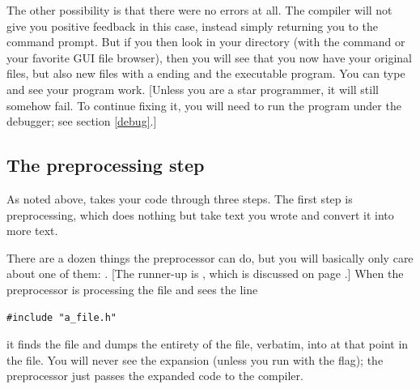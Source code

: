 The other possibility is that there were no errors at all. The compiler
will not give you positive feedback in this case, instead simply returning
you to the command prompt. But if you then look in your directory
(with the command  or your favorite GUI file browser),
then you will see that you now have your original  files,
but also new files with a  ending and the 
executable program. You can type  and see your program
work. [Unless you are a star programmer, it will still somehow fail. To
continue fixing it, you will need to run the program under the debugger;
see section \ref{debug}.]

\subsection{The preprocessing step} \label{headers}
As noted above,  takes your code through three steps.
The first step is preprocessing,
which does nothing but take text 
you wrote and convert it into more text.


There are a dozen things the preprocessor can do, but you will basically only care about one of them: . 
[The runner-up is , which is discussed on page \pageref{macros}.] 
When the preprocessor is processing the file  and sees
the line
\begin{lstlisting}
#include "a_file.h"
\end{lstlisting}
it finds the file  and dumps the entirety of the file,
verbatim, into  at that point in the file. You will never
see the expansion (unless you run  with the 
flag); the preprocessor just passes the expanded code to the compiler.

